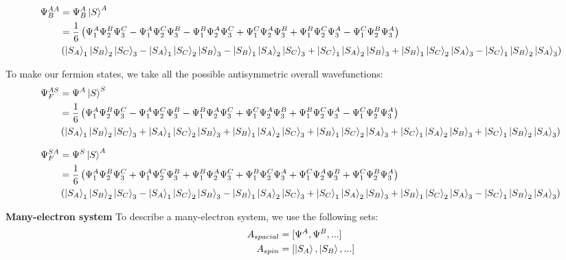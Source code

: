 \documentclass[10pt]{article} %
\begin{document}
\begin{align*}
  \Psi_B^{AA} &= \Psi_B^A\ket{S}^A\\
  &= \frac{1}{6}\left(\Psi_1^A\Psi_2^B\Psi_3^C - \Psi_1^A\Psi_2^C\Psi_3^B
  - \Psi_1^B\Psi_2^A\Psi_3^C + \Psi_1^C\Psi_2^A\Psi_3^B
  + \Psi_1^B\Psi_2^C\Psi_3^A - \Psi_1^C\Psi_2^B\Psi_3^A\right)\\
  &\left(\ket{S_A}_1\ket{S_B}_2\ket{S_C}_3 - \ket{S_A}_1\ket{S_C}_2\ket{S_B}_3
  - \ket{S_B}_1\ket{S_A}_2\ket{S_C}_3 + \ket{S_C}_1\ket{S_A}_2\ket{S_B}_3
  + \ket{S_B}_1\ket{S_C}_2\ket{S_A}_3 - \ket{S_C}_1\ket{S_B}_2\ket{S_A}_3\right)\\
\end{align*}

To make our fermion states, we take all the possible antisymmetric overall wavefunctions:\\

\begin{align*}
  \Psi_F^{AS} &= \Psi^A\ket{S}^S\\
  &= \frac{1}{6}\left(\Psi_1^A\Psi_2^B\Psi_3^C - \Psi_1^A\Psi_2^C\Psi_3^B
  - \Psi_1^B\Psi_2^A\Psi_3^C + \Psi_1^C\Psi_2^A\Psi_3^B
  + \Psi_1^B\Psi_2^C\Psi_3^A - \Psi_1^C\Psi_2^B\Psi_3^A\right)\\
  &\left(\ket{S_A}_1\ket{S_B}_2\ket{S_C}_3 + \ket{S_A}_1\ket{S_C}_2\ket{S_B}_3
  + \ket{S_B}_1\ket{S_A}_2\ket{S_C}_3 + \ket{S_B}_1\ket{S_C}_2\ket{S_A}_3
  + \ket{S_C}_1\ket{S_A}_2\ket{S_B}_3 + \ket{S_C}_1\ket{S_B}_2\ket{S_A}_3\right)\\
\end{align*}

\begin{align*}
  \Psi_F^{SA} &= \Psi^S\ket{S}^A\\
  &= \frac{1}{6}\left(\Psi_1^A\Psi_2^B\Psi_3^C + \Psi_1^A\Psi_2^C\Psi_3^B
  + \Psi_1^B\Psi_2^A\Psi_3^C + \Psi_1^B\Psi_2^C\Psi_3^A
  + \Psi_1^C\Psi_2^A\Psi_3^B + \Psi_1^C\Psi_2^B\Psi_3^A\right)\\
  &\left(\ket{S_A}_1\ket{S_B}_2\ket{S_C}_3 - \ket{S_A}_1\ket{S_C}_2\ket{S_B}_3
  - \ket{S_B}_1\ket{S_A}_2\ket{S_C}_3 + \ket{S_C}_1\ket{S_A}_2\ket{S_B}_3
  + \ket{S_B}_1\ket{S_C}_2\ket{S_A}_3 - \ket{S_C}_1\ket{S_B}_2\ket{S_A}_3\right)\\
\end{align*}

\textbf{Many-electron system}
To describe a many-electron system, we use the following sets:\\

\begin{align*}
  A_{spacial} &= [\Psi^A, \Psi^B, ...]\\
  A_{spin} &= [\ket{S_A}, \ket{S_B}, ...]\\
\end{align*}
\end{document}
